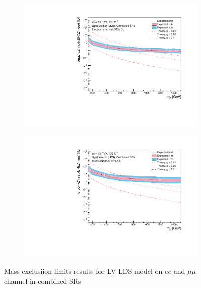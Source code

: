 \documentclass[12pt, a4paper]{book}
\begin{document}
\begin{figure}[!ht]
	\centering
	\begin{subfigure}[b]{0.49\textwidth}
      \centering
      \includegraphics[width=1\textwidth]{Limits/Model_independent/LV_LDS/mass_exclusion_ee.pdf}
   \end{subfigure}
   \hfill
   \begin{subfigure}[b]{0.49\textwidth}
      \centering
      \includegraphics[width=1\textwidth]{Limits/Model_independent/LV_LDS/mass_exclusion_uu.pdf}
   \end{subfigure}
   \caption{Mass exclusiion limits results for LV LDS model on $ee$ and $\mu\mu$ channel in combined SRs}\label{fig:LV_LDS_me_comb}
\end{figure}
\clearpage
\end{document}
